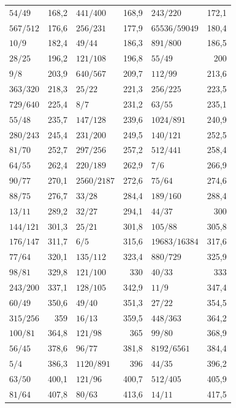{\begin{longtable}{l r @{\qquad} l r @{\qquad} l r}
$54/49$ & 168{,}2 & $441/400$ & 168{,}9 & $243/220$ & 172{,}1 \\
$567/512$ & 176{,}6 & $256/231$ & 177{,}9 & $65536/59049$ & 180{,}4 \\
$10/9$ & 182{,}4 & $49/44$ & 186{,}3 & $891/800$ & 186{,}5 \\
$28/25$ & 196{,}2 & $121/108$ & 196{,}8 & $55/49$ & 200 \\
$9/8$ & 203{,}9 & $640/567$ & 209{,}7 & $112/99$ & 213{,}6 \\
$363/320$ & 218{,}3 & $25/22$ & 221{,}3 & $256/225$ & 223{,}5 \\
$729/640$ & 225{,}4 & $8/7$ & 231{,}2 & $63/55$ & 235{,}1 \\
$55/48$ & 235{,}7 & $147/128$ & 239{,}6 & $1024/891$ & 240{,}9 \\
$280/243$ & 245{,}4 & $231/200$ & 249{,}5 & $140/121$ & 252{,}5 \\
$81/70$ & 252{,}7 & $297/256$ & 257{,}2 & $512/441$ & 258{,}4 \\
$64/55$ & 262{,}4 & $220/189$ & 262{,}9 & $7/6$ & 266{,}9 \\
$90/77$ & 270{,}1 & $2560/2187$ & 272{,}6 & $75/64$ & 274{,}6 \\
$88/75$ & 276{,}7 & $33/28$ & 284{,}4 & $189/160$ & 288{,}4 \\
$13/11$ & 289{,}2 & $32/27$ & 294{,}1 & $44/37$ & 300 \\
$144/121$ & 301{,}3 & $25/21$ & 301{,}8 & $105/88$ & 305{,}8 \\
$176/147$ & 311{,}7 & $6/5$ & 315{,}6 & $19683/16384$ & 317{,}6 \\
$77/64$ & 320{,}1 & $135/112$ & 323{,}4 & $880/729$ & 325{,}9 \\
$98/81$ & 329{,}8 & $121/100$ & 330 & $40/33$ & 333 \\
$243/200$ & 337{,}1 & $128/105$ & 342{,}9 & $11/9$ & 347{,}4 \\
$60/49$ & 350{,}6 & $49/40$ & 351{,}3 & $27/22$ & 354{,}5 \\
$315/256$ & 359 & $16/13$ & 359{,}5 & $448/363$ & 364{,}2 \\
$100/81$ & 364{,}8 & $121/98$ & 365 & $99/80$ & 368{,}9 \\
$56/45$ & 378{,}6 & $96/77$ & 381{,}8 & $8192/6561$ & 384{,}4 \\
$5/4$ & 386{,}3 & $1120/891$ & 396 & $44/35$ & 396{,}2 \\
$63/50$ & 400{,}1 & $121/96$ & 400{,}7 & $512/405$ & 405{,}9 \\
$81/64$ & 407{,}8 & $80/63$ & 413{,}6 & $14/11$ & 417{,}5 \\

\end{longtable}}
